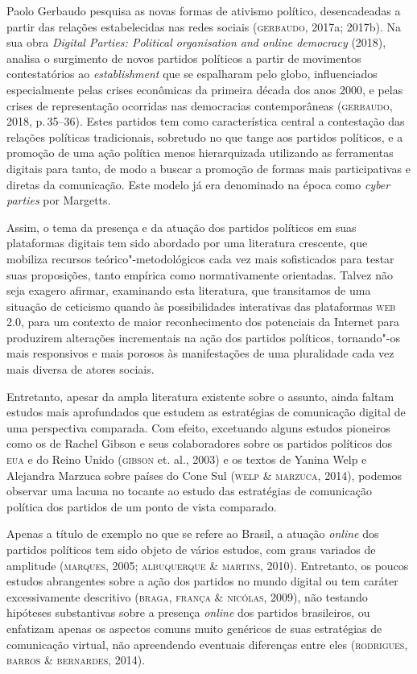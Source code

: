 Paolo Gerbaudo pesquisa as novas formas de ativismo político,
desencadeadas a partir das relações estabelecidas nas redes sociais
(\textsc{gerbaudo}, 2017a; 2017b). Na sua obra \textit{Digital Parties: Political
organisation and online democracy} (2018), analisa o surgimento de novos
partidos políticos a partir de movimentos contestatórios ao
\textit{establishment} que se espalharam pelo globo, influenciados
especialmente pelas crises econômicas da primeira década dos anos 2000,
e pelas crises de representação ocorridas nas democracias contemporâneas
(\textsc{gerbaudo}, 2018, p.\,35--36). Estes partidos tem como característica
central a contestação das relações políticas tradicionais, sobretudo no
que tange aos partidos políticos, e a promoção de uma ação política
menos hierarquizada utilizando as ferramentas digitais para tanto, de
modo a buscar a promoção de formas mais participativas e diretas da
comunicação. Este modelo já era denominado na época como \textit{cyber
parties} por Margetts.

Assim, o tema da presença e da atuação dos partidos políticos em suas
plataformas digitais tem sido abordado por uma literatura crescente, que
mobiliza recursos teórico"-metodológicos cada vez mais sofisticados para
testar suas proposições, tanto empírica como normativamente orientadas.
Talvez não seja exagero afirmar, examinando esta literatura, que
transitamos de uma situação de ceticismo quando às possibilidades
interativas das plataformas \textsc{web 2.0}, para um contexto de maior
reconhecimento dos potenciais da Internet para produzirem alterações
incrementais na ação dos partidos políticos, tornando"-os mais
responsivos e mais porosos às manifestações de uma pluralidade cada vez
mais diversa de atores sociais.

Entretanto, apesar da ampla literatura existente sobre o assunto, ainda
faltam estudos mais aprofundados que estudem as estratégias de
comunicação digital de uma perspectiva comparada. Com efeito, excetuando
alguns estudos pioneiros como os de Rachel Gibson e seus colaboradores
sobre os partidos políticos dos \textsc{eua} e do Reino Unido (\textsc{gibson} et. al.,
2003) e os textos de Yanina Welp e Alejandra Marzuca sobre países do
Cone Sul (\textsc{welp \& marzuca}, 2014), podemos observar uma lacuna no tocante
ao estudo das estratégias de comunicação política dos partidos de um
ponto de vista comparado. 

Apenas a título de exemplo no que se refere ao
Brasil, a atuação \textit{online} dos partidos políticos tem sido objeto de vários
estudos, com graus variados de amplitude (\textsc{marques}, 2005; \textsc{albuquerque} \&
\textsc{martins}, 2010). Entretanto, os poucos estudos abrangentes sobre a ação
dos partidos no mundo digital ou tem caráter excessivamente descritivo
(\textsc{braga}, \textsc{frança \& nicólas}, 2009), não testando hipóteses substantivas
sobre a presença \textit{online} dos partidos brasileiros, ou enfatizam apenas os
aspectos comuns muito genéricos de suas estratégias de comunicação
virtual, não apreendendo eventuais diferenças entre eles (\textsc{rodrigues},
\textsc{barros \& bernardes}, 2014).

